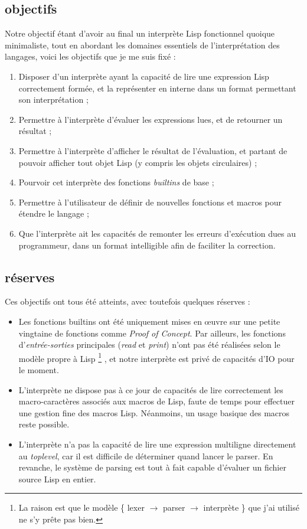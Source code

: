 \documentclass{article}
\begin{document}
\subsection{objectifs}
Notre objectif étant d'avoir au final un interprète Lisp fonctionnel quoique minimaliste, tout en abordant les domaines 
essentiels de l’interprétation des langages, voici les objectifs que je me suis fixé :
\begin{enumerate}
  \item Disposer d'un interprète ayant la capacité de lire une expression Lisp correctement formée, 
  et la représenter en interne dans un format permettant son interprétation ;
  \item Permettre à l'interprète d'évaluer les expressions lues, et de retourner un résultat ;
  \item Permettre à l'interprète d'afficher le résultat de l'évaluation, et partant de pouvoir 
  afficher tout objet Lisp (y compris les objets circulaires) ;
  \item Pourvoir cet interprète des fonctions \emph{builtins} de base ;
  \item Permettre à l'utilisateur de définir de nouvelles fonctions et macros pour étendre le langage ;
  \item Que l'interprète ait les capacités de remonter les erreurs d’exécution dues au programmeur, 
  dans un format intelligible afin de faciliter la correction.
\end{enumerate}
\subsection{réserves}
Ces objectifs ont tous été atteints, avec toutefois quelques réserves :
\begin{itemize}
  \item Les fonctions builtins ont été uniquement mises en œuvre sur une petite vingtaine de fonctions comme \emph{Proof of Concept}.
  Par ailleurs, les fonctions d'\emph{entrée-sorties} principales (\emph{read} et \emph{print}) n'ont pas été réalisées 
  selon le modèle propre à Lisp 
	\footnote{La raison est que le modèle \{ lexer $\rightarrow$ parser $\rightarrow$ interprète \} que j'ai utilisé 
	ne s'y prête pas bien.}
  , et notre interprète est privé de capacités d'IO pour le moment.
  \item L'interprète ne dispose pas à ce jour de capacités de lire correctement les macro-caractères associés aux macros de Lisp, 
  faute de temps pour effectuer une gestion fine des macros Lisp. Néanmoins, un usage basique des macros reste possible.
  \item L'interprète n'a pas la capacité de lire une expression multiligne directement au \emph{toplevel}, 
  car il est difficile de déterminer quand lancer le parser.
  En revanche, le système de parsing est tout à fait capable d'évaluer un fichier source Lisp en entier.
\end{itemize}
\end{document}
